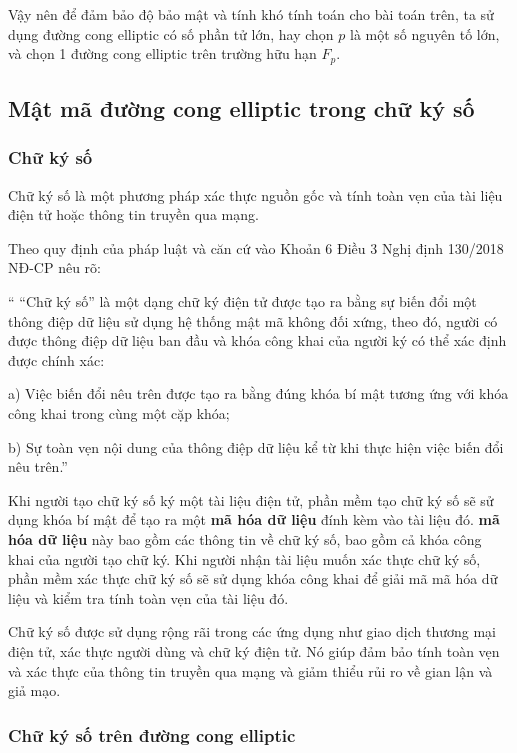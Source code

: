 Vậy nên để đảm bảo độ bảo mật và tính khó tính toán cho bài toán trên,
ta sử dụng đường cong elliptic có số phần tử lớn, hay chọn $p$ là một
số nguyên tố lớn, và chọn 1 đường cong elliptic trên trường hữu hạn $F_p$. \cite{elliptic}

\subsection{Mật mã đường cong elliptic trong chữ ký số}
\subsubsection{Chữ ký số} 

Chữ ký số là một phương pháp xác thực nguồn gốc và tính toàn vẹn của tài liệu điện tử hoặc thông tin truyền qua mạng. 

Theo quy định của pháp luật và căn cứ vào Khoản 6 Điều 3 Nghị định 130/2018 NĐ-CP nêu rõ: 

`` “Chữ ký số” là một dạng chữ ký điện tử được tạo ra bằng sự biến đổi một thông điệp dữ liệu sử dụng hệ thống mật mã không đối xứng, theo đó, người có được thông điệp dữ liệu ban đầu và khóa công khai của người ký có thể xác định được chính xác:

a) Việc biến đổi nêu trên được tạo ra bằng đúng khóa bí mật tương ứng với khóa công khai trong cùng một cặp khóa;

b) Sự toàn vẹn nội dung của thông điệp dữ liệu kể từ khi thực hiện việc biến đổi nêu trên.”

Khi người tạo chữ ký số ký một tài liệu điện tử, phần mềm tạo chữ ký số sẽ sử dụng khóa bí mật để tạo ra một \textbf{mã hóa dữ liệu} đính kèm vào tài liệu đó. \textbf{mã hóa dữ liệu}  này bao gồm các thông tin về chữ ký số, bao gồm cả khóa công khai của người tạo chữ ký. Khi người nhận tài liệu muốn xác thực chữ ký số, phần mềm xác thực chữ ký số sẽ sử dụng khóa công khai để giải mã mã hóa dữ liệu và kiểm tra tính toàn vẹn của tài liệu đó.

Chữ ký số được sử dụng rộng rãi trong các ứng dụng như giao dịch thương mại điện tử, xác thực người dùng và chữ ký điện tử. Nó giúp đảm bảo tính toàn vẹn và xác thực của thông tin truyền qua mạng và giảm thiểu rủi ro về gian lận và giả mạo.

\subsubsection{Chữ ký số trên đường cong elliptic}
\label{sec:ecdsa}


